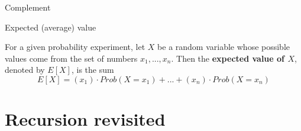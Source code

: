 \documentclass[a4paper,12pt]{book}
\begin{document}
{\begin{intro}{Complement}
        \end{intro}

        \begin{intro}{Expected (average) value}

            For a given probability experiment, let $X$ be a random
            variable whose possible values come from the set of numbers
            $ x_{1}, ..., x_{n} $. Then the \textbf{expected value of $X$},
            denoted by $E[X]$, is the sum
            $$ E[X] = (x_{1}) \cdot Prob(X = x_{1}) + ... + (x_{n}) \cdot Prob(X = x_{n}) $$

        \end{intro}

    }

        \notonkey{ \newpage }{ \hrulefill }
        
    \section{Recursion revisited}
\end{document}
